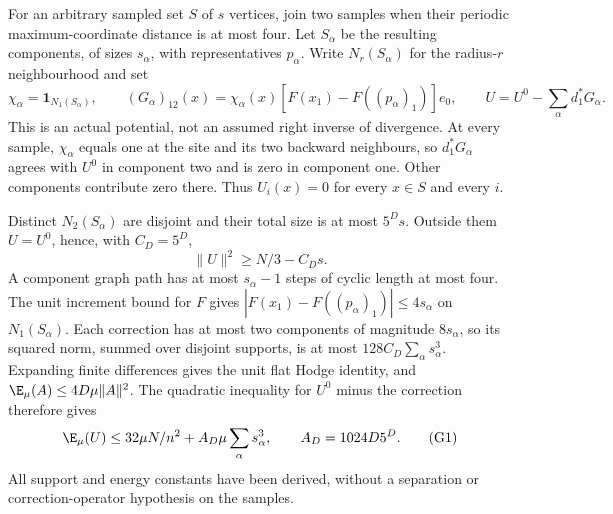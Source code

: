 For an arbitrary sampled set $S$ of $s$ vertices, join two samples when
their periodic maximum-coordinate distance is at most four. Let $S_\alpha$
be the resulting components, of sizes $s_\alpha$, with representatives
$p_\alpha$. Write $N_r(S_\alpha)$ for the radius-$r$ neighbourhood and set
\[
 \chi_\alpha=\mathbf1_{N_1(S_\alpha)},\qquad
 (G_\alpha)_{12}(x)=\chi_\alpha(x)
       [F(x_1)-F((p_\alpha)_1)]e_0,
 \qquad U=U^0-\sum_\alpha d_1^*G_\alpha.
\]
This is an actual potential, not an assumed right inverse of divergence.
At every sample, $\chi_\alpha$ equals one at the site and its two backward
neighbours, so $d_1^*G_\alpha$ agrees with $U^0$ in component two and is
zero in component one. Other components contribute zero there. Thus
$U_i(x)=0$ for every $x\in S$ and every $i$.

Distinct $N_2(S_\alpha)$ are disjoint and their total size is at most
$5^Ds$. Outside them $U=U^0$, hence, with $C_D=5^D$,
\[
 \|U\|^2\geq N/3-C_Ds.
\]
A component graph path has at most $s_\alpha-1$ steps of cyclic length
at most four. The unit increment bound for $F$ gives
$|F(x_1)-F((p_\alpha)_1)|\leq4s_\alpha$ on $N_1(S_\alpha)$.
Each correction has at most two components of magnitude $8s_\alpha$,
so its squared norm, summed over disjoint supports, is at most
$128C_D\sum_\alpha s_\alpha^3$. Expanding finite differences gives the
unit flat Hodge identity, and $\E_\mu(A)\leq4D\mu\|A\|^2$.
The quadratic inequality for $U^0$ minus the correction therefore gives
\[
 \E_\mu(U)\leq32\mu N/n^2+A_D\mu\sum_\alpha s_\alpha^3,
 \qquad A_D=1024D5^D.                                      \tag{G1}
\]
All support and energy constants have been derived, without a separation
or correction-operator hypothesis on the samples.

